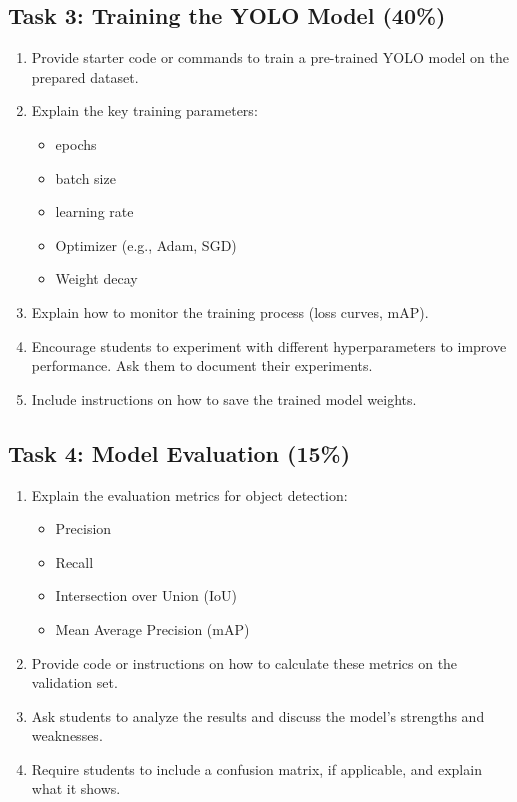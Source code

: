 \documentclass[11pt]{article}
\begin{document}
\subsection{Task 3: Training the YOLO Model (40\%)}
\label{sec:org85f5a29}
\begin{enumerate}
\item Provide starter code or commands to train a
pre-trained YOLO model on the prepared dataset.
\item Explain the key training parameters:
\begin{itemize}
\item epochs
\item batch size
\item learning rate
\item Optimizer (e.g., Adam, SGD)
\item Weight decay
\end{itemize}
\item Explain how to monitor the training process (loss
curves, mAP).
\item Encourage students to experiment with different
hyperparameters to improve performance. Ask them to
document their experiments.
\item Include instructions on how to save the trained
model weights.
\end{enumerate}
\subsection{Task 4: Model Evaluation (15\%)}
\label{sec:org436269a}
\begin{enumerate}
\item Explain the evaluation metrics for object detection:
\begin{itemize}
\item Precision
\item Recall
\item Intersection over Union (IoU)
\item Mean Average Precision (mAP)
\end{itemize}
\item Provide code or instructions on how to calculate
these metrics on the validation set.
\item Ask students to analyze the results and discuss the
model's strengths and weaknesses.
\item Require students to include a confusion matrix, if
applicable, and explain what it shows.
\end{enumerate}
\end{document}
